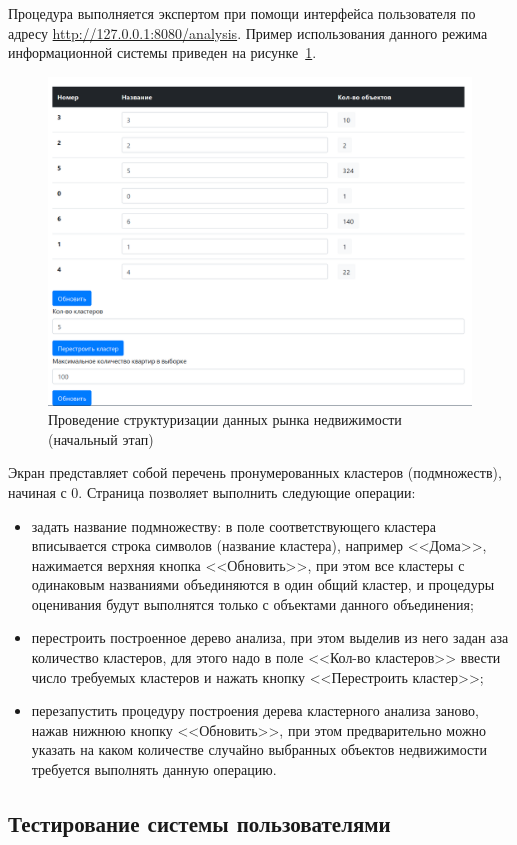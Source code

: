 \documentclass[a4paper,14pt,openany,final]{extreport} %
\def\oldcaption{} \let\oldcaption=\caption
\def\caption{\stepcounter{captionsnum}\oldcaption}
\begin{document}
{Процедура выполняется экспертом при помощи интерфейса пользователя по адресу \url{http://127.0.0.1:8080/analysis}. Пример использования данного режима информационной системы приведен на рисунке~\ref{fig:exclus1}.
\begin{figure}[htbp]
  \centering
  \includegraphics[width=0.8\linewidth]{screen-cluster-start.png}
  \caption{Проведение структуризации данных рынка недвижимости (начальный этап)}
  \label{fig:exclus1}
\end{figure}

Экран представляет собой перечень пронумерованных кластеров (подмножеств), начиная с 0.  Страница позволяет выполнить следующие операции:
\begin{itemize}
\item задать название подмножеству: в поле соответствующего кластера вписывается строка символов (название кластера), например <<Дома>>, нажимается верхняя кнопка <<Обновить>>, при этом все кластеры с одинаковым названиями объединяются в один общий кластер, и процедуры оценивания будут выполнятся только с объектами данного объединения;
\item перестроить построенное дерево анализа, при этом выделив из него задан аза количество кластеров, для этого надо в поле <<Кол-во кластеров>> ввести число требуемых кластеров и нажать кнопку <<Перестроить кластер>>;
\item перезапустить процедуру построения дерева кластерного анализа заново, нажав нижнюю кнопку <<Обновить>>, при этом предварительно можно указать на каком количестве случайно выбранных объектов недвижимости требуется выполнять данную операцию.
\end{itemize}

\subsection{Тестирование системы пользователями}


}
\end{document}
